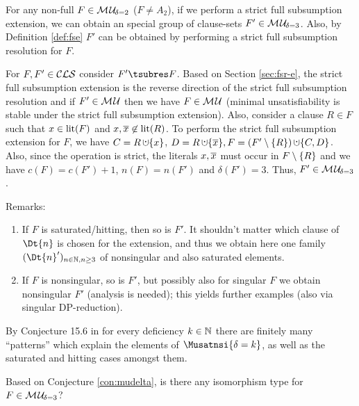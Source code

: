 \documentclass{report}
\begin{document}
\begin{lem}\label{lem:mu2tomu3}
For any non-full $F \in \mathcal{M\hspace{0.8pt}U}_{\!\delta=2}$ ($F \not = A_2$), if we perform a strict full subsumption extension, we can obtain an special group of clause-sets $F' \in \mathcal{M\hspace{0.8pt}U}_{\!\delta=3}$. Also, by Definition \ref{def:fse} $F'$ can be obtained by performing a strict full subsumption resolution for $F$.
\end{lem}
\begin{prf}
For $F, F' \in \mathcal{CLS}$ consider $ F' \tsubres F$. Based on Section \ref{sec:fsr-e}, the strict full subsumption extension is the reverse direction of the  strict full subsumption resolution and if $F' \in \mathcal{M\hspace{0.8pt}U}$ then we have $F \in \mathcal{M\hspace{0.8pt}U}$ (minimal unsatisfiability is stable under the strict full subsumption extension). Also, consider a clause $R \in F$ such that $ x \in \operatorname{lit}(F)$ and $x, \overline x \not \in \operatorname{lit}(R)$. To perform the strict full subsumption extension for $F$, we have $C = R \addcup \set{x}$, $D = R \addcup \set{\ol{x}}, F = (F' \sm \set{R}) \addcup \set{C,D}$. Also, since the operation is strict, the literals $x, \overline x$ must occur in $F \setminus \{ R \}$ and we have $c(F)=c(F')+1$, $n(F)=n(F')$ and $\delta(F')=3$. Thus, $F' \in \mathcal{M\hspace{0.8pt}U}_{\!\delta=3}$.

\end{prf}
Remarks:
\begin{enumerate}
\item If $F$ is saturated/hitting, then so is $F'$. It shouldn't matter which clause of $\Dt{n}$ is chosen for the extension, and thus we obtain here one family $(\Dt{n}')_{n \in \NN, n \ge 3}$ of nonsingular and also saturated elements.
\item If $F$ is nonsingular, so is $F'$, but possibly also for singular $F$ we obtain nonsingular $F'$ (analysis is needed); this yields further examples (also via singular DP-reduction).
\end{enumerate}

\begin{conj}\label{con:mudelta}
By Conjecture 15.6 in \cite{KullmannZhao2010Extremal} for every deficiency $k \in \mathbb{N}$ there are finitely many ``patterns'' which explain the elements of $\Musatnsi{\delta=k}$, as well as the saturated and hitting cases amongst them.
\end{conj}
 
\begin{quest}\label{que:str-3}
Based on Conjecture \ref{con:mudelta}, is there any isomorphism type for $F \in \mathcal{M\hspace{0.8pt}U}_{\!\delta=3}$?
\end{quest}
\end{document}
